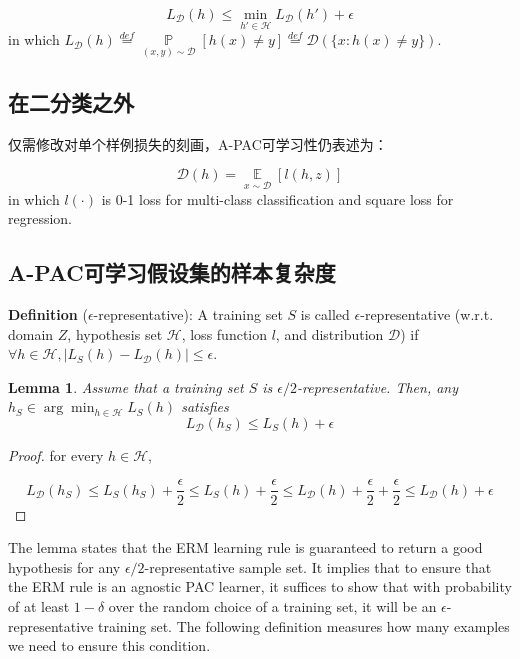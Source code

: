 \documentclass{article}
\newtheorem{lemma}{Lemma}
\newtheorem*{proof}{Proof}
\begin{document}
	\begin{equation*}
	L_\mathcal{D}(h)\leq\min\limits_{h'\in\mathcal{H}}L_\mathcal{D}(h')+\epsilon
	\end{equation*}
in which $L_\mathcal{D}(h)\overset{def}{=}\mathop{\mathbb{P}}\limits_{(x,y)\sim\mathcal{D}}[h(x)\neq y]\overset{def}{=}\mathcal{D}(\{x:h(x)\neq y\})$.

	\subsection{在二分类之外}

	仅需修改对单个样例损失的刻画，A-PAC可学习性仍表述为：
	
	\begin{equation}
	\mathcal{D}(h)=\mathop{\mathbb{E}}\limits_{x\sim\mathcal{D}}[l(h,z)]
	\end{equation}
in which $l(\cdot)$ is 0-1 loss for multi-class classification and square loss for regression. 

	\subsection{A-PAC可学习假设集的样本复杂度}
	
	\textbf{Definition} ($\epsilon$-representative): A training set $S$ is called $\epsilon$-representative (w.r.t. domain $Z$, hypothesis set $\mathcal{H}$, loss function $l$, and distribution $\mathcal{D}$) if $\forall h\in\mathcal{H},|L_S(h)-L_\mathcal{D}(h)|\leq\epsilon$.
	
	\begin{lemma}
	Assume that a training set $S$ is $\epsilon/2$-representative. Then, any $h_S\in\arg\min_{h\in\mathcal{H}}L_S(h)$ satisfies
	\begin{equation}
	L_\mathcal{D}(h_S) \leq L_S(h)+\epsilon
	\end{equation}
	\end{lemma}
	
	\begin{proof}
	for every $h\in\mathcal{H}$,
	
	\begin{equation*}
	L_\mathcal{D}(h_S) \leq L_S(h_S)+\frac{\epsilon}{2}
	\leq L_S(h)+\frac{\epsilon}{2} \leq L_\mathcal{D}(h)+\frac{\epsilon}{2}+\frac{\epsilon}{2}
	\leq L_\mathcal{D}(h)+\epsilon
	\end{equation*}	 
	\end{proof}
	
	The lemma states that the ERM learning rule is guaranteed to return a good hypothesis for any $\epsilon/2$-representative sample set. It implies that to ensure that the ERM rule is an agnostic PAC learner, it suffices to show that with probability of at least $1-\delta$ over the random choice of a training set, it will be an $\epsilon$-representative training set. The following definition measures how many examples we need to ensure this condition.
	
\end{document}
